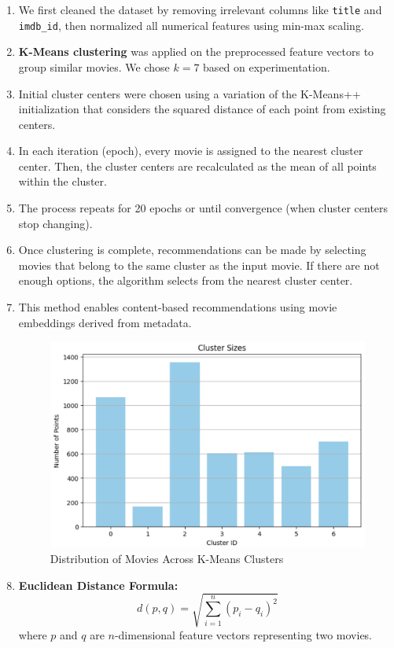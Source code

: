 \documentclass[a4paper]{article}
\theoremstyle{plain}
\begin{document}
\begin{enumerate}
    \item We first cleaned the dataset by removing irrelevant columns like \texttt{title} and \texttt{imdb\_id}, then normalized all numerical features using min-max scaling.

    \item \textbf{K-Means clustering} was applied on the preprocessed feature vectors to group similar movies. We chose $k = 7$ based on experimentation.

    \item Initial cluster centers were chosen using a variation of the K-Means++ initialization that considers the squared distance of each point from existing centers.

    \item In each iteration (epoch), every movie is assigned to the nearest cluster center. Then, the cluster centers are recalculated as the mean of all points within the cluster.

    \item The process repeats for 20 epochs or until convergence (when cluster centers stop changing).

    \item Once clustering is complete, recommendations can be made by selecting movies that belong to the same cluster as the input movie. If there are not enough options, the algorithm selects from the nearest cluster center.

    \item This method enables content-based recommendations using movie embeddings derived from metadata.

    \begin{figure}[H]
        \centering
        \includegraphics[width=\linewidth]{clustering1.png}
        \caption{Distribution of Movies Across K-Means Clusters}
        \label{fig:cluster_dist}
    \end{figure}

    \item 

    \textbf{Euclidean Distance Formula:}
    \[
    d(p, q) = \sqrt{\sum_{i=1}^{n} (p_i - q_i)^2}
    \]
    where $p$ and $q$ are $n$-dimensional feature vectors representing two movies.


    
\end{enumerate}
\end{document}
